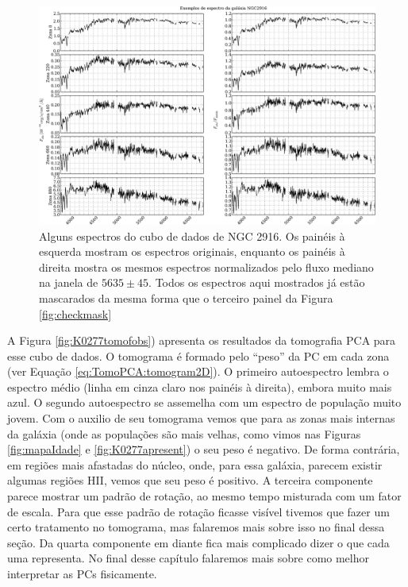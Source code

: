 \begin{figure}
	\includegraphics[width=1.\textwidth]{figuras/K0277-exampleSpectra-crop.pdf}
    \caption[Exemplos de espectros da gal\'axia NGC 2916 (CALIFA 277).]
    {Alguns espectros do cubo de dados de NGC 2916. Os painéis à esquerda mostram os espectros originais, enquanto os
    painéis à direita mostra os mesmos espectros normalizados pelo fluxo mediano na janela de $5635 \pm 45$. Todos os
    espectros aqui mostrados já estão mascarados da mesma forma que o terceiro painel da Figura \ref{fig:checkmask}}
    \label{fig:K0277ExampleSpectra}
\end{figure}

A Figura \ref{fig:K0277tomofobs}) apresenta os resultados da tomografia PCA para esse cubo de dados. O tomograma é
formado pelo ``peso'' da PC em cada zona (ver Equação \ref{eq:TomoPCA:tomogram2D}). O primeiro autoespectro lembra o
espectro médio (linha em cinza claro nos painéis à direita), embora muito mais azul. O segundo autoespectro se assemelha
com um espectro de população muito jovem. Com o auxilio de seu tomograma vemos que para as zonas mais internas da
galáxia (onde as populações são mais velhas, como vimos nas Figuras \ref{fig:mapaIdade} e \ref{fig:K0277apresent}) o seu
peso é negativo. De forma contrária, em regiões mais afastadas do núcleo, onde, para essa galáxia, parecem existir
algumas regiões HII, vemos que seu peso é positivo. A terceira componente parece mostrar um padrão de rotação, ao mesmo
tempo misturada com um fator de escala. Para que esse padrão de rotação ficasse visível tivemos que fazer um certo
tratamento no tomograma, mas falaremos mais sobre isso no final dessa seção. Da quarta componente em diante fica mais
complicado dizer o que cada uma representa. No final desse capítulo falaremos mais sobre como melhor interpretar as PCs
fisicamente.

